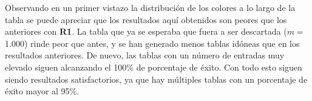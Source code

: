 \documentclass[12pt,spanish,listoffigures,listoftables]{tfgetsinf}
\begin{document}
\def\arraystretch{1.5}
\begin{table}[H]
	\LARGE
	\centering
	\caption{Porcentajes de éxito para las tablas empleando \textbf{R2}}
	\label{resR2}
\end{table}


Observando en un primer vistazo la distribución de los colores a lo largo de la tabla se puede apreciar que los resultados aquí obtenidos son peores que los anteriores con \textbf{R1}. La tabla que ya se esperaba que fuera a ser descartada ($m =$ 1.000) rinde peor que antes, y se han generado menos tablas idóneas que en los resultados anteriores. De nuevo, las tablas con un número de entradas muy elevado siguen alcanzando el 100\% de porcentaje de éxito. Con todo esto siguen siendo resultados satisfactorios, ya que hay múltiples tablas con un porcentaje de éxito mayor al 95\%.
\end{document}
